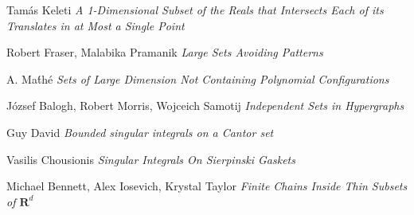 \documentclass{article}
\theoremstyle{plain}
\theoremstyle{plain}
\begin{document}
\begin{thebibliography}{9}

Tam\'{a}s Keleti
\textit{A 1-Dimensional Subset of the Reals that Intersects Each of its Translates in at Most a Single Point}

Robert Fraser, Malabika Pramanik
\textit{Large Sets Avoiding Patterns}

A. Ma\'{t}h\'{e}
\textit{Sets of Large Dimension Not Containing Polynomial Configurations}

J\'{o}zsef Balogh, Robert Morris, Wojceich Samotij
\textit{Independent Sets in Hypergraphs}

Guy David
\textit{Bounded singular integrals on a Cantor set}

Vasilis Chousionis
\textit{Singular Integrals On Sierpinski Gaskets}

Michael Bennett, Alex Iosevich, Krystal Taylor
\textit{Finite Chains Inside Thin Subsets of $\mathbf{R}^d$}

\end{thebibliography}

\end{document}
